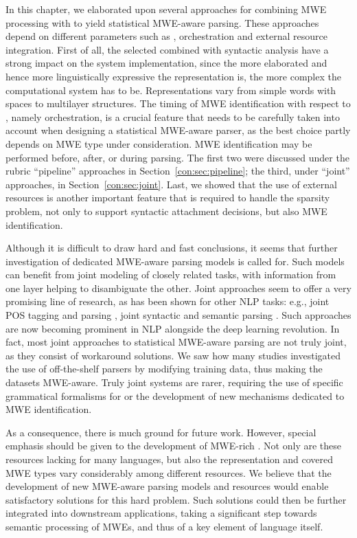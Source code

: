 \documentclass[output=paper]{langsci/langscibook}
\begin{document}
In this chapter, we 
elaborated upon
several approaches for combining MWE processing with  to yield statistical MWE-aware parsing. These approaches depend on different parameters such as , orchestration and external resource integration. First of all, the selected  combined with syntactic analysis have a strong impact on the system implementation, since 
the more elaborated and hence more linguistically expressive the representation is, the more complex the computational system has to be.
Representations vary from simple words with spaces to multilayer structures. The timing of MWE identification with respect to , namely orchestration, is a crucial feature that needs to be carefully taken into account when designing a statistical MWE-aware parser, as the best choice partly depends on MWE type under consideration. MWE identification may be performed before, after, or during parsing. The first two were discussed under the rubric ``pipeline'' approaches in Section~\ref{con:sec:pipeline}; the third, under ``joint'' approaches, in Section~\ref{con:sec:joint}. Last, we showed that the use of external resources is another important feature that is required to handle the sparsity problem, not only to support syntactic attachment decisions, but also MWE identification. 

Although it is difficult to draw hard and fast conclusions, it seems that further investigation of dedicated MWE-aware parsing models is 
called for.
Such models can benefit from joint modeling of closely related tasks, with information from one layer helping to disambiguate the other. 
Joint approaches seem to offer a very promising line of research, as has been shown for other NLP tasks: e.g., joint POS tagging and parsing \citep{bohnet:2013}, joint syntactic and semantic parsing \citep{henderson:2013}. Such approaches are now becoming prominent in NLP alongside the deep learning revolution. In fact, most joint approaches to statistical MWE-aware parsing are not truly joint, as they consist of workaround solutions. We saw how many studies investigated the use of off-the-shelf parsers by modifying training data, thus making the datasets MWE-aware. Truly joint systems are rarer, requiring the use of specific grammatical formalisms for  or the development of new  mechanisms dedicated to MWE identification. 

As a consequence, there is much ground for future work.
However, special emphasis should be given to the development of MWE-rich .
Not only are these resources lacking for many languages, but also the representation and covered MWE types vary considerably among different resources.
We believe that the development of new MWE-aware parsing models and resources would enable satisfactory solutions for this hard problem.
Such solutions could then be further integrated into downstream applications, taking a significant step towards semantic processing of MWEs, and thus of a key element of language itself.
\end{document}
